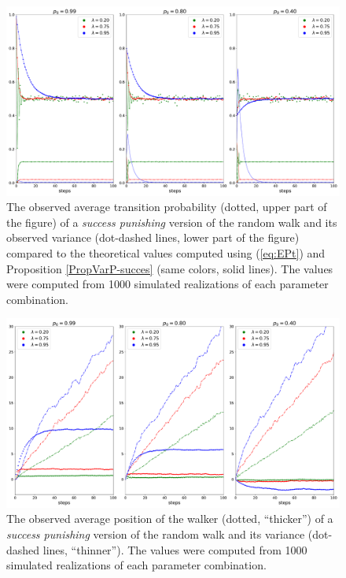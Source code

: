 \documentclass{amsart}
\theoremstyle{definition}
\theoremstyle{plain}
\theoremstyle{plain}
\theoremstyle{plain}
\numberwithin{equation}{section}
\begin{document}
\begin{figure}
 \begin{center}
\includegraphics[width=1\textwidth]{../simulations/e_probability_1000_walks_100_steps_type_success_punished}
\caption{\label{fig:The-development-punished}The observed
average transition probability (dotted, upper part of the figure)
of a \emph{success punishing} version of the random walk and its observed
variance (dot-dashed lines, lower part of the figure) compared to
the theoretical values computed using (\ref{eq:EPt}) and Proposition
\ref{PropVarP-succes} (same colors, solid lines). The values were
computed from 1000 simulated realizations of each parameter combination.}
 \end{center}
\end{figure}

\begin{figure}
 \begin{center}
\includegraphics[width=1\textwidth]{../simulations/e_position_1000_walks_100_steps_type_success_punished}
\caption{\label{fig:position-punished}The observed
average position of the walker (dotted, ``thicker'')
of a \emph{success punishing} version of the random walk and its variance (dot-dashed lines, ``thinner''). The values were
computed from 1000 simulated realizations of each parameter combination.}
 \end{center}
\end{figure}
\end{document}
